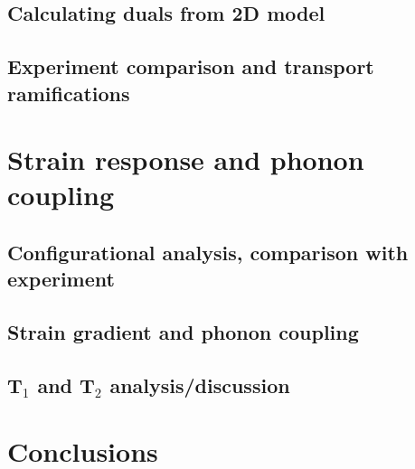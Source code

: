     \section{Calculating duals from 2D model}
    \section{Experiment comparison and transport ramifications}
    \chapter{Strain response and phonon coupling}
    \section{Configurational analysis, comparison with experiment}
    \section{Strain gradient and phonon coupling}
    \section{\texorpdfstring{T$_1$ and T$_2$}{T₁ and T₂} analysis/discussion}
    \chapter{Conclusions}

    
    \begin{singlespace} %
    \newcommand{\maybebackrefprint}{ \backrefprint}
    \renewcommand*{\bibpreamble}{\thumb{Bibliography}}%
    
    \end{singlespace}

  

  \backmatter



